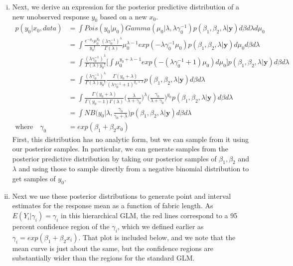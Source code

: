 \documentclass[12pt]{article}
\begin{document}
\begin{enumerate}[(a)]
\begin{enumerate}[(i)]
	\item Next, we derive an expression for the posterior predictive distribution of a new unobserved response $y_0$ based on a new $x_0$. 
	\begin{align*}
	p(y_0|x_0, data) &= \int Pois(y_0|\mu_0)Gamma(\mu_0|\lambda, \lambda\gamma_0^{-1})p(\beta_1, \beta_2, \lambda|\textbf{y}) d\beta d\lambda d\mu_0\\
	&= \int \frac{e^{-\mu_0}\mu_0^{y_0}}{y_0!} \frac{(\lambda \gamma_0^{-1})^{\lambda}}{\Gamma(\lambda)}\mu_0^{\lambda -1} exp(-\lambda \gamma_0^{-1} \mu_0) p(\beta_1, \beta_2, \lambda|\textbf{y}) d\mu_0 d\beta d\lambda\\
	&= \int \frac{(\lambda \gamma_0^{-1})^{\lambda}}{\Gamma(\lambda)y_0!} \bigg[\int \mu_0^{y_0 + \lambda - 1} exp(-(\lambda \gamma_0^{-1} + 1) \mu_0) d\mu_0 \bigg]p(\beta_1, \beta_2, \lambda|\textbf{y})d\beta d\lambda\\
	&= \int \frac{(\lambda \gamma_0^{-1})^{\lambda}}{\Gamma(\lambda)y_0!} \frac{\Gamma(y_0 + \lambda)}{(\lambda \gamma_0^{-1} + 1)^{y_0 + \lambda}}p(\beta_1, \beta_2, \lambda|\textbf{y})d\beta d\lambda\\
	&= \int \frac{\Gamma(y_0+\lambda)}{\Gamma(y_0 - 1)\Gamma(\lambda)} \bigg(\frac{\lambda}{\lambda + \gamma_0}\bigg)^{\lambda}\bigg(\frac{\gamma_0}{\lambda + \gamma_0}\bigg)^{y_0} p(\beta_1, \beta_2, \lambda|\textbf{y})d\beta d\lambda\\ 
	&= \int NB\bigg(y_0|\lambda, \frac{\gamma_0}{\gamma_0 + \lambda}\bigg)p(\beta_1, \beta_2, \lambda|\textbf{y})d\beta d\lambda\\
	\text{where}\quad \gamma_0 &= exp(\beta_1 + \beta_2 x_0) 
	\end{align*}
	First, this distribution has no analytic form, but we can sample from it using our posterior samples.
	In particular, we can generate samples from the posterior predictive distribution by taking our posterior samples of $\beta_1, \beta_2$ and $\lambda$ and using those to sample directly from a negative binomial distribution to get samples of $y_0$. 
	\item 
	Next we use these posterior distributions to generate point and interval estimates for the response mean as a function of fabric length. As $E(Y_i|\gamma_i) = \gamma_i$ in this hierarchical GLM, the red lines correspond to a 95 percent confidence region of the $\gamma_i$, which we defined earlier as $\gamma_i = exp(\beta_1 + \beta_2x_i)$. That plot is included below, and we note that the mean curve is just about the same, but the confidence regions are substantially wider than the regions for the standard GLM.\\

\end{enumerate}
\end{enumerate}
\end{document}
